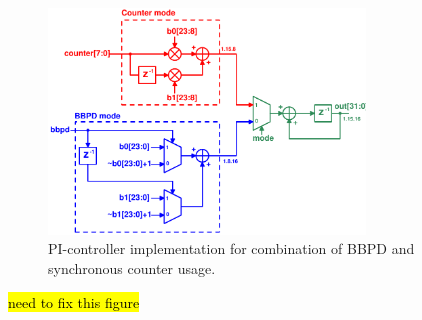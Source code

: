 			\begin{figure}[htb!]
			        \centering
			        \includegraphics[width=0.75\textwidth, angle=0]{./figs/mux_datapath}
			    \caption{PI-controller implementation for combination of BBPD and synchronous counter usage.}
			    \label{fig:pi_dig_imp}
			\end{figure}
			\hl{need to fix this figure}






